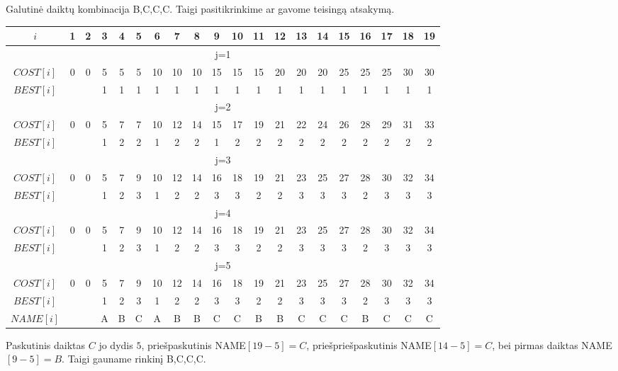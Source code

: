 \documentclass[a4paper,lithuanian]{article}
\begin{document}
Galutinė daiktų kombinacija B,C,C,C. Taigi pasitikrinkime ar gavome teisingą atsakymą.\\
\begin{center}
\begin{tabular}{ c c c c c c c c c c c c c c c c c c c c }
  \hline
  $i$        & 1 & 2 & 3 & 4 & 5 & 6  & 7  & 8  & 9  & 10 & 11 & 12 & 13 & 14 & 15 & 16 & 17 & 18 & 19\\
  \hline
  \multicolumn{20}{c}{j=1}\\
  \hline
  $COST[i]$ & 0 & 0 & 5 & 5 & 5 & 10 & 10 & 10 & 15 & 15 & 15 & 20 & 20 & 20 & 25 & 25 & 25 & 30 & 30\\
  $BEST[i]$  &   &   & 1 & 1 & 1 & 1  & 1  & 1  & 1  & 1  & 1  &  1 &  1 &  1 &  1 &  1 &  1 &  1 &  1\\
  \hline
  \multicolumn{20}{c}{j=2}\\
  \hline
  $COST[i]$ & 0 & 0 & 5 & 7 & 7 & 10 & 12 & 14 & 15 & 17 & 19 & 21 & 22 & 24 & 26 & 28 & 29 & 31 & 33\\
  $BEST[i]$ &   &   & 1 & 2 & 2 & 1 & 2 & 2 & 1 & 2 & 2 & 2 & 2 & 2 & 2 & 2 & 2 & 2 & 2\\
  \hline
  \multicolumn{20}{c}{j=3}\\
  \hline
  $COST[i]$ & 0 & 0 & 5 & 7 & 9 & 10 & 12 & 14 & 16 & 18 & 19 & 21 & 23 & 25 & 27 & 28 & 30 & 32 & 34\\
  $BEST[i]$ &   &   & 1 & 2 & 3 & 1 & 2 & 2 & 3 & 3 & 2 & 2 & 3 & 3 & 3 & 2 & 3 & 3 & 3\\
  \hline
  \multicolumn{20}{c}{j=4}\\
  \hline
  $COST[i]$ & 0 & 0 & 5 & 7 & 9 & 10 & 12 & 14 & 16 & 18 & 19 & 21 & 23 & 25 & 27 & 28 & 30 & 32 & 34\\
  $BEST[i]$ &   &   & 1 & 2 & 3 & 1 & 2 & 2 & 3 & 3 & 2 & 2 & 3 & 3 & 3 & 2 & 3 & 3 & 3\\
  \hline
  \multicolumn{20}{c}{j=5}\\
  \hline
  $COST[i]$ & 0 & 0 & 5 & 7 & 9 & 10 & 12 & 14 & 16 & 18 & 19 & 21 & 23 & 25 & 27 & 28 & 30 & 32 & 34\\
  $BEST[i]$ &   &   & 1 & 2 & 3 & 1 & 2 & 2 & 3 & 3 & 2 & 2 & 3 & 3 & 3 & 2 & 3 & 3 & 3\\
  $NAME[i]$ &   &   & A & B & C & A & B & B & C & C & B & B & C & C & C & B & C & C & C\\
  \hline
\end{tabular}
\end{center}

Paskutinis daiktas $C$ jo dydis $5$, priešpaskutinis NAME$[19 - 5] = C$, priešpriešpaskutinis NAME$[14 - 5] = C$, bei pirmas daiktas NAME$[9-5] = B$. Taigi gauname rinkinį B,C,C,C.
\end{document}
